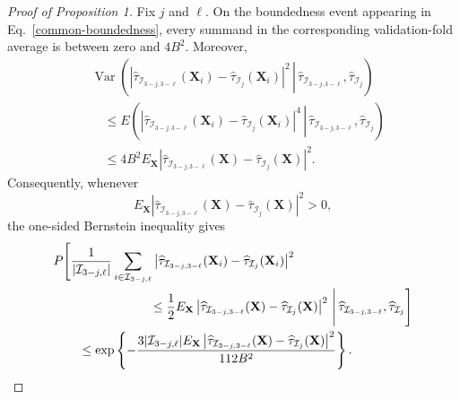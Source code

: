 \documentclass[11pt]{article}
\theoremstyle{referenceplain}
\theoremstyle{referencedefinition}
\theoremstyle{referenceremark}
\begin{document}
\begin{proof}[Proof of Proposition 1]
Fix $j$ and $\ell$. On the boundedness event appearing in
Eq.~\eqref{common-boundedness}, every summand in the corresponding
validation-fold average is between zero and $4B^2$. Moreover,
\begin{align*}
&\operatorname{Var}\left(
\left.
\left|
\widehat\tau_{\mathcal I_{3-j,3-\ell}}(\mathbf X_i)
-\widehat\tau_{\mathcal I_j}(\mathbf X_i)
\right|^2
\,\right|\,
\widehat\tau_{\mathcal I_{3-j,3-\ell}},
\widehat\tau_{\mathcal I_j}
\right)\\
&\quad\le
E\left(
\left.
\left|
\widehat\tau_{\mathcal I_{3-j,3-\ell}}(\mathbf X_i)
-\widehat\tau_{\mathcal I_j}(\mathbf X_i)
\right|^4
\,\right|\,
\widehat\tau_{\mathcal I_{3-j,3-\ell}},
\widehat\tau_{\mathcal I_j}
\right)\\
&\quad\le
4B^2
E_{\mathbf X}\left|
\widehat\tau_{\mathcal I_{3-j,3-\ell}}(\mathbf X)
-\widehat\tau_{\mathcal I_j}(\mathbf X)
\right|^2.
\end{align*}
Consequently, whenever
\[
E_{\mathbf X}\left|
\widehat\tau_{\mathcal I_{3-j,3-\ell}}(\mathbf X)
-\widehat\tau_{\mathcal I_j}(\mathbf X)
\right|^2>0,
\]
the one-sided Bernstein inequality gives
\begin{align}
&P\Bigg[
\frac{1}{|\mathcal I_{3-j,\ell}|}
\sum_{i\in\mathcal I_{3-j,\ell}}
\left|
\widehat\tau_{\mathcal I_{3-j,3-\ell}}(\mathbf X_i)
-\widehat\tau_{\mathcal I_j}(\mathbf X_i)
\right|^2
\notag\\
&\hspace{27mm}\le
\frac12
E_{\mathbf X}\left|
\widehat\tau_{\mathcal I_{3-j,3-\ell}}(\mathbf X)
-\widehat\tau_{\mathcal I_j}(\mathbf X)
\right|^2
\,\Bigg|\,
\widehat\tau_{\mathcal I_{3-j,3-\ell}},
\widehat\tau_{\mathcal I_j}
\Bigg]
\notag\\
&\qquad\le
\exp\left\{
-\frac{
3|\mathcal I_{3-j,\ell}|
E_{\mathbf X}\left|
\widehat\tau_{\mathcal I_{3-j,3-\ell}}(\mathbf X)
-\widehat\tau_{\mathcal I_j}(\mathbf X)
\right|^2
}{
112B^2
}
\right\}.
\label{conditional-bernstein}
\end{align}


\end{proof}
\end{document}
